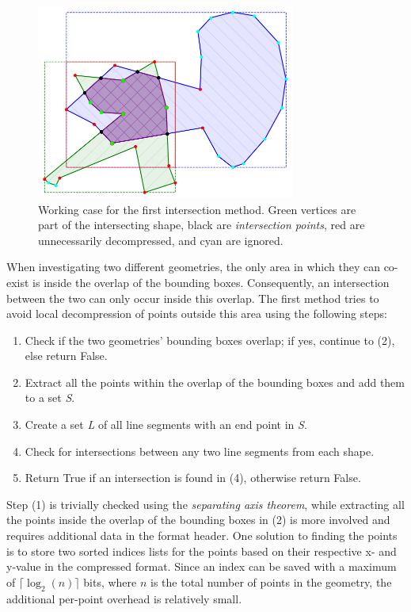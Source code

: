 \begin{figure}[htbp]
    \centering
    \includegraphics[width=8.5cm]{images/intersection_v1.png}
    \caption{Working case for the first intersection method. Green vertices are part of the intersecting shape, black are \textit{intersection points}, red are unnecessarily decompressed, and cyan are ignored.}
    \label{fig:intersectv1demo}
\end{figure}

When investigating two different geometries, the only area in which they can co-exist is inside the overlap of the bounding boxes. Consequently, an intersection between the two can only occur inside this overlap. The first method tries to avoid local decompression of points outside this area using the following steps:

\begin{enumerate}
    \item Check if the two geometries' bounding boxes overlap; if yes, continue to (2), else return False.
    \item Extract all the points within the overlap of the bounding boxes and add them to a set \textit{S}.
    \item Create a set \textit{L} of all line segments with an end point in \textit{S}.
    \item Check for intersections between any two line segments from each shape.
    \item  Return True if an intersection is found in (4), otherwise return False.
\end{enumerate}

Step (1) is trivially checked using the \textit{separating axis theorem}, while extracting all the points inside the overlap of the bounding boxes in (2) is more involved and requires additional data in the format header. One solution to finding the points is to store two sorted indices lists for the points based on their respective x- and y-value in the compressed format. Since an index can be saved with a maximum of $\lceil \log_2(n) \rceil$ bits, where $n$ is the total number of points in the geometry, the additional per-point overhead is relatively small. 

